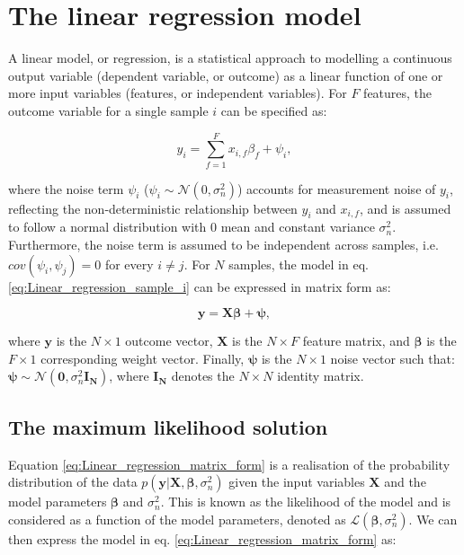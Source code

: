 
\section{The linear regression model} 
\label{sec:linear_regression}

A linear model, or regression, is a statistical approach to modelling a continuous output variable (dependent variable, or outcome) as a linear function of one or more input variables (features, or independent variables). 
For $F$ features, the outcome variable for a single sample $i$ can be specified as:

\begin{equation} \label{eq:Linear_regression_sample_i}
 y_i = \sum_{f=1}^{F} x_{i,f}\beta_f + \psi_i,
\end{equation}

where the noise term $\psi_i$ ($ \psi_i \sim \mathcal{N}(0, \sigma_n^2)$) accounts for measurement noise of $y_i$, reflecting the non-deterministic relationship between $y_i$ and $x_{i,f}$, and is assumed to follow a normal distribution with $0$ mean and constant variance $\sigma_n^2$. 
Furthermore, the noise term is assumed to be independent across samples, i.e. $cov(\psi_i, \psi_j)=0$ for every $i \neq j$. 
For $N$ samples, the model in eq. \eqref{eq:Linear_regression_sample_i} can be expressed in matrix form as:

\begin{equation} \label{eq:Linear_regression_matrix_form}
\mathbf{y} = \mathbf{X}\boldsymbol{\beta} + \boldsymbol{\psi}, 
\end{equation}

where $\mathbf{y}$ is the $N \times 1$ outcome vector, $\mathbf{X}$ is the $N \times F$ feature matrix, and $\boldsymbol{\beta}$ is the $F \times 1$ corresponding weight vector. 
Finally, $\boldsymbol{\psi}$ is the $N \times 1$ noise vector such that: $\boldsymbol{\psi}\sim \mathcal{N}(\mathbf{0}, \sigma_n^2 \mathbf{I_N})$, where $\mathbf{I_N}$ denotes the $N \times N$ identity matrix. 


\subsection{The maximum likelihood solution}

Equation \eqref{eq:Linear_regression_matrix_form} is a realisation of the probability distribution of the data $p(\mathbf{y}| \mathbf{X}, \boldsymbol{\beta}, \sigma_n^2)$ given the input variables $\mathbf{X}$ and the model parameters $\boldsymbol{\beta}$ and $\sigma_n^2$.
This is known as the likelihood of the model and is considered as a function of the model parameters, denoted as $\mathcal{L}(\boldsymbol{\beta}, \sigma_n^2)$. 
We can then express the model in eq. \eqref{eq:Linear_regression_matrix_form} as:

